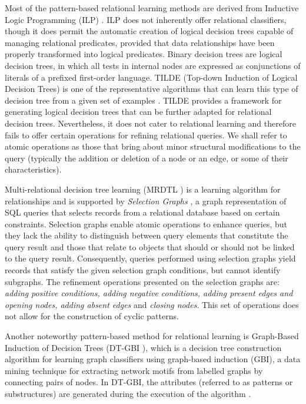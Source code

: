 \documentclass{article}%
\begin{document}
Most of the pattern-based relational learning methods are derived from Inductive Logic Programming (ILP) \citep{plotkin1972automatic}. ILP does not inherently offer relational classifiers, though it does permit the automatic creation of logical decision trees capable of managing relational predicates, provided that data relationships have been properly transformed into logical predicates. Binary decision trees are logical decision trees, in which all tests in internal nodes are expressed as conjunctions of literals of a prefixed first-order language. TILDE (Top-down Induction of Logical Decision Trees) is one of the representative algorithms that can learn this type of decision tree from a given set of examples \citep{BLOCKEEL1998285}. TILDE provides a framework for generating logical decision trees that can be further adapted for relational decision trees. Nevertheless, it does not cater to relational learning and therefore fails to offer certain operations for refining relational queries. We shall refer to atomic operations as those that bring about minor structural modifications to the query (typically the addition or deletion of a node or an edge, or some of their characteristics).

Multi-relational decision tree learning (MRDTL \citep{Leiva02mrdtl:a}) is a learning algorithm for relationships and is supported by \textit{Selection Graphs} \citep{Knobbe99multi-relationaldecision}, a graph representation of SQL queries that selects records from a relational database based on certain constraints. Selection graphs enable atomic operations to enhance queries, but they lack the ability to distinguish between query elements that constitute the query result and those that relate to objects that should or should not be linked to the query result. Consequently, queries performed using selection graphs yield records that satisfy the given selection graph conditions, but cannot identify subgraphs. The refinement operations presented on the selection graphs are: \textit{adding positive conditions, adding negative conditions, adding present edges and opening nodes, adding absent edges} and \textit{closing nodes}. This set of operations does not allow for the construction of cyclic patterns.

Another noteworthy pattern-based method for relational learning is Graph-Based Induction of Decision Trees (DT-GBI \citep{Nguyen2005}), which is a decision tree construction algorithm for learning graph classifiers using graph-based induction (GBI), a data mining technique for extracting network motifs from labelled graphs by connecting pairs of nodes. In DT-GBI, the attributes (referred to as patterns or substructures) are generated during the execution of the algorithm \citep{Geamsakul2003}.
\end{document}
